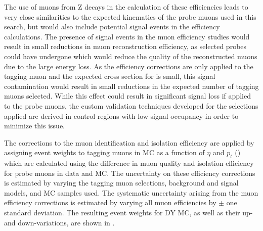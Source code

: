 The use of muons from Z decays in the calculation of these efficiencies leads to very close similarities to the expected kinematics of the probe muons used in this search, but would also include potential signal events in the efficiency calculations. 
The presence of signal events in the muon efficiency studies would result in small reductions in muon reconstruction efficiency, as selected probes could have undergone \dbrem which would reduce the quality of the reconstructed muons due to the large energy loss. 
As the efficiency corrections are only applied to the tagging muon and the expected cross section for \dbrem is small, this signal contamination would result in small reductions in the expected number of tagging muons selected.
While this effect could result in significant signal loss if applied to the probe muons, the custom validation techniques developed for the selections applied are derived in control regions with low signal occupancy in order to minimize this issue.

The corrections to the muon identification and isolation efficiency are applied by assigning event weights to tagging muons in MC as a function of $\eta$ and $p_t$ () which are calculated using the difference in muon quality and isolation efficiency for probe muons in data and MC. 
The uncertainty on these efficiency corrections is estimated by varying the tagging muon selections, background and signal models, and MC samples used. 
The systematic uncertainty arising from the muon efficiency corrections is estimated by varying all muon efficiencies by $\pm$ one standard deviation.
The resulting event weights for DY MC, as well as their up- and down-variations, are shown in .

